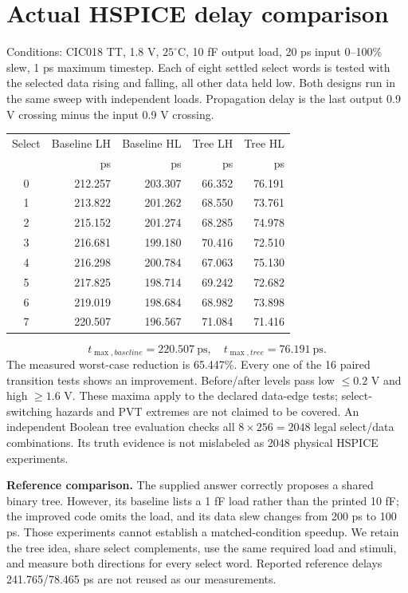 \documentclass[11pt,a4paper]{article}
\begin{document}
\newpage\section*{Actual HSPICE delay comparison}
Conditions: CIC018 TT, 1.8 V, $25^\circ$C, 10 fF output load, 20 ps input
0--100\% slew, 1 ps maximum timestep. Each of eight settled select words is
tested with the selected data rising and falling, all other data held low.
Both designs run in the same sweep with independent loads. Propagation delay
is the last output 0.9 V crossing minus the input 0.9 V crossing.
\begin{center}\begin{tabular}{crrrr}\toprule
Select&Baseline LH&Baseline HL&Tree LH&Tree HL\\&ps&ps&ps&ps\\\midrule
0&212.257&203.307&66.352&76.191\\
1&213.822&201.262&68.550&73.761\\
2&215.152&201.274&68.285&74.978\\
3&216.681&199.180&70.416&72.510\\
4&216.298&200.784&67.063&75.130\\
5&217.825&198.714&69.242&72.682\\
6&219.019&198.684&68.982&73.898\\
7&220.507&196.567&71.084&71.416\\
\bottomrule\end{tabular}\end{center}
\[
 \boxed{t_{\max,baseline}=220.507\ \mathrm{ps},\quad
 t_{\max,tree}=76.191\ \mathrm{ps}.}
\]
The measured worst-case reduction is 65.447\%. Every one of the 16
paired transition tests shows an improvement. Before/after levels pass low
$\le0.2$ V and high $\ge1.6$ V. These maxima apply to the declared data-edge
tests; select-switching hazards and PVT extremes are not claimed to be covered.
An independent Boolean tree evaluation checks all $8\times256=2048$ legal
select/data combinations. Its truth evidence is not mislabeled as 2048
physical HSPICE experiments.

\textbf{Reference comparison.} The supplied answer correctly proposes a
shared binary tree. However, its baseline lists a 1 fF load rather than the
printed 10 fF; the improved code omits the load, and its data slew changes
from 200 ps to 100 ps. Those experiments cannot establish a matched-condition
speedup. We retain the tree idea, share select complements, use the same
required load and stimuli, and measure both directions for every select word.
Reported reference delays 241.765/78.465 ps are not reused as our measurements.
\end{document}
